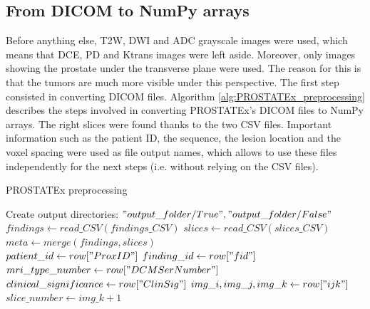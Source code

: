 \subsection{From DICOM to NumPy arrays}
\label{sec:DICOMtoNumPy}
Before anything else, T2W, DWI and ADC grayscale images were used, which means that DCE, PD and Ktrans images were left aside. Moreover, only images showing the prostate under the transverse plane were used. The reason for this is that the tumors are much more visible under this perspective. 
The first step consisted in converting DICOM files. Algorithm \ref{alg:PROSTATEx_preprocessing} describes the steps involved in converting PROSTATEx's DICOM files to NumPy arrays. The right slices were found thanks to the two CSV files. Important information such as the patient ID, the sequence, the lesion location and the voxel spacing were used as file output names, which allows to use these files independently for the next steps (i.e. without relying on the CSV files). 

\begin{algorithm}
    \caption{PROSTATEx preprocessing}
    \label{alg:PROSTATEx_preprocessing}
    \begin{algorithmic}[1] %
        		\State Create output directories: $"output\_folder/True", "output\_folder/False"$\\
        		\State $findings \gets read\_CSV(findings\_CSV)$ 
        		\State $slices \gets read\_CSV(slices\_CSV)$ 
            \State $meta \gets merge(findings, slices)$\\
            		\State $patient\_id \gets row["ProxID"]$
            		\State $finding\_id \gets row["fid"]$
            		\State $mri\_type\_number \gets row["DCMSerNumber"]$
            		\State $clinical\_significance \gets row["ClinSig"]$
            		\State $img\_i, img\_j, img\_k \gets row["ijk"]$
            		\State $slice\_number \gets img\_k + 1$ \\
                						 
                					\EndIf
                				\EndFor
                			\EndIf
            			\EndFor
            		\EndFor
            \EndFor
        \EndProcedure
    \end{algorithmic}
\end{algorithm} 


